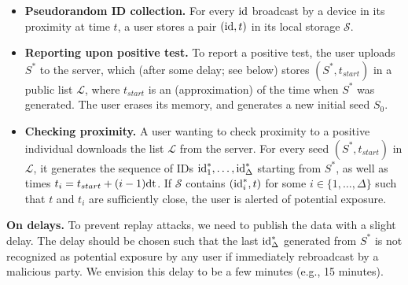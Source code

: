 \documentclass{article}
\newcommand{\TODO}[1]{ {\color{blue} #1 }}
\begin{document}
\begin{itemize}
\item {\bf Pseudorandom ID collection.} For every $\mathrm{id}$ broadcast by a device in its proximity at time $t$, a user stores a pair $(\mathrm{id}, t)$ in its local storage $\mathcal{S}$.
\item {\bf Reporting upon positive test.} To report a positive test, the user uploads $S^*$ to the server, which (after some delay; see below) stores $(S^*, t_{start})$ in a public list $\mathcal{L}$, where $t_{start}$ is an (approximation) of the time when $S^*$ was generated. The user erases its memory, and generates a new initial seed $S_0$. 
\item {\bf Checking proximity.} A user wanting to check proximity to a positive individual downloads the list $\mathcal{L}$ from the server. For every seed $(S^*,t_{start})$ in $\mathcal{L}$, it generates the sequence of IDs $\mathrm{id}^*_1, \ldots, \mathrm{id}^*_{\Delta}$ starting from $S^*$, as well as times $t_i = t_{start} + (i-1) \mathrm{dt}$. If $\mathcal{S}$ contains $(\mathrm{id}_i^*, t)$ for some $i \in \{1, \ldots, \Delta\}$ such that $t$ and $t_i$ are sufficiently close, the user is alerted of potential exposure.
\end{itemize}
{\bf On delays.} To prevent replay attacks, we need to publish the data with a slight delay. The delay should be chosen such that the last $\mathrm{id}^*_{\Delta}$ generated from $S^*$ is not recognized as potential exposure by any user if immediately rebroadcast by a malicious party. We envision this delay to be a few minutes (e.g., 15 minutes).
\end{document}
